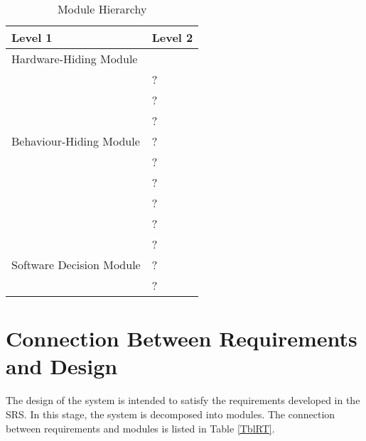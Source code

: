 \documentclass[12pt, titlepage]{article}
\begin{document}
\begin{table}[h!]
	\centering
	\begin{tabular}{p{} p{}}
		\toprule
		\textbf{Level 1}                                      & \textbf{Level 2} \\
		\midrule

		{Hardware-Hiding Module}                              & ~                \\
		\midrule

		\multirow{7}{0.3\textwidth}{Behaviour-Hiding Module}  & ?                \\
		                                                      & ?                \\
		                                                      & ?                \\
		                                                      & ?                \\
		                                                      & ?                \\
		                                                      & ?                \\
		                                                      & ?                \\
		                                                      & ?                \\
		\midrule

		\multirow{3}{0.3\textwidth}{Software Decision Module} & {?}              \\
		                                                      & ?                \\
		                                                      & ?                \\
		\bottomrule

	\end{tabular}
	\caption{Module Hierarchy}
	\label{TblMH}
\end{table}

\section{Connection Between Requirements and Design} \label{SecConnection}

The design of the system is intended to satisfy the requirements developed in the SRS. In this
stage, the system is decomposed into modules. The connection between requirements and modules is
listed in Table \ref{TblRT}.
\end{document}
